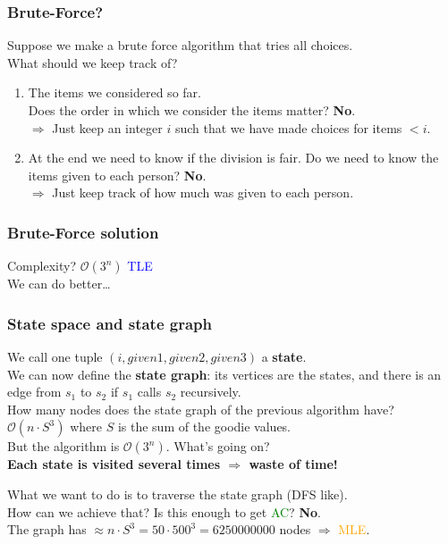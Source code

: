 \documentclass[12pt]{beamer}
\newcommand{\bigoh}[1]{\mathcal{O}\left(#1\right)}
\newcommand{\TLE}{\textcolor{blue}{TLE}}
\newcommand{\MLE}{\textcolor{orange}{MLE}}
\newcommand{\AC}{\textcolor{green}{AC}}
\newcommand{\blank}{\vspace{.5cm}}
\begin{document}
\begin{frame}
    \frametitle{Brute-Force?}
    Suppose we make a brute force algorithm that tries all choices. 
    \\\blank
    What should we keep track of? \pause \\\blank
    \begin{enumerate}
        \item The items we considered so far. \\\blank
            Does the order in which we consider the items matter? \pause \textbf{No}. \\\blank
            $ \Rightarrow $ Just keep an integer $i$ such that we have made choices for items $< i$. \pause \\\blank
        \item At the end we need to know if the division is fair. Do we need to know the items given to each person? \pause \textbf{No}. \\\blank
            $ \Rightarrow $ Just keep track of how much was given to each person.
    \end{enumerate}
\end{frame}

\begin{frame}
    \frametitle{Brute-Force solution}
    
    \pause
    Complexity? \pause $\bigoh{3^n}$ \TLE \\\blank
    We can do better\ldots
\end{frame}

\begin{frame}
    \frametitle{State space and state graph}
    We call one tuple $ (i, given1, given2, given3) $ a \textbf{state}. \\\blank
    We can now define the \textbf{state graph}: its vertices are the states, and there is an edge from $s_1$ to $s_2$ if $s_1$ calls $s_2$ recursively. \\\blank
    How many nodes does the state graph of the previous algorithm have? \\\blank
    $ \bigoh{n \cdot S^3} $ where $S$ is the sum of the goodie values. \\\blank
    But the algorithm is $\bigoh{3^n}$. What's going on? \pause \\\blank
    \textbf{Each state is visited several times $\Rightarrow$ waste of time!}
\end{frame}

\begin{frame}
    What we want to do is to traverse the state graph (DFS like). \\\blank
    How can we achieve that? \pause
     \pause \blank
    Is this enough to get \AC? \pause \textbf{No}. \\
    The graph has $ \approx n \cdot S^3 = 50 \cdot 500^3 = 6250000000$ nodes $\Rightarrow$ \MLE.
\end{frame}
\end{document}
